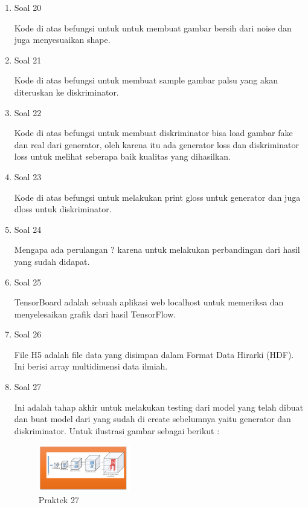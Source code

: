 \begin{enumerate}
    \item Soal 20
	\hfill\break
	
    Kode di atas befungsi untuk untuk membuat gambar bersih dari noise dan juga menyesuaikan shape.
    
    \item Soal 21
	\hfill\break
	
    Kode di atas befungsi untuk membuat sample gambar palsu yang akan diteruskan ke diskriminator.
    
    \item Soal 22
	\hfill\break
	
	Kode di atas befungsi untuk membuat diskriminator bisa load gambar fake dan real dari generator, oleh karena itu ada generator loss dan diskriminator loss untuk melihat seberapa baik kualitas yang dihasilkan.

    \item Soal 23
	\hfill\break
	
    Kode di atas befungsi untuk melakukan print gloss untuk generator dan juga dloss untuk diskriminator.
    
    \item Soal 24
	\hfill\break
	
    Mengapa ada perulangan ? karena untuk melakukan perbandingan dari hasil yang sudah didapat.
    
    \item Soal 25
	\hfill\break
	
    TensorBoard adalah sebuah aplikasi web localhost untuk memeriksa dan menyelesaikan grafik dari hasil TensorFlow.
    
    \item Soal 26
	\hfill\break
	
    File H5 adalah file data yang disimpan dalam Format Data Hirarki (HDF). Ini berisi array multidimensi data ilmiah.
    
    \item Soal 27
	\hfill\break
	
    Ini adalah tahap akhir untuk melakukan testing dari model yang telah dibuat dan buat model dari yang sudah di create sebelumnya yaitu generator dan diskriminator. Untuk ilustrasi gambar sebagai berikut : 
    \begin{figure}[H]
		\includegraphics[width=4cm]{figures/1164013/8/praktek27.png}
		\centering
		\caption{Praktek 27}
    \end{figure}
\end{enumerate}

